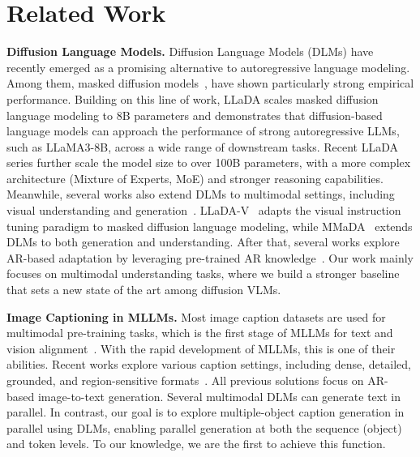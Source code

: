 \section{Related Work}
\label{sec:related_work}

\noindent
\textbf{Diffusion Language Models.} Diffusion Language Models (DLMs) have recently emerged as a promising alternative to autoregressive language modeling. 
%
Among them, masked diffusion models~\citep{you2025llada, ye2025dream, yangmmada}, have shown particularly strong empirical performance.
%
Building on this line of work, LLaDA scales masked diffusion language modeling to 8B parameters and demonstrates that diffusion-based language models can approach the performance of strong autoregressive LLMs, such as LLaMA3-8B, across a wide range of downstream tasks.
%
Recent LLaDA series further scale the model size to over 100B parameters, with a more complex architecture (Mixture of Experts, MoE) and stronger reasoning capabilities.
%
Meanwhile, several works also extend DLMs to multimodal settings, including visual understanding and generation~\citep{yangmmada, xin2025lumina}.
%
LLaDA-V~\citep{you2025llada} adapts the visual instruction tuning paradigm to masked diffusion language modeling, while MMaDA~\citep{yangmmada} extends DLMs to both generation and understanding.
%
After that, several works explore AR-based adaptation by leveraging pre-trained AR knowledge~\citep{cheng2025sdar, bie2025llada2}.
%
Our work mainly focuses on multimodal understanding tasks, where we build a stronger baseline that sets a new state of the art among diffusion VLMs.


\noindent
\textbf{Image Captioning in MLLMs.} Most image caption datasets are used for multimodal pre-training tasks, which is the first stage of MLLMs for text and vision alignment~\citep{li2025llava}.
%
With the rapid development of MLLMs, this is one of their abilities.
%
Recent works explore various caption settings, including dense, detailed, grounded, and region-sensitive formats~\citep{li2025denseworld, wang2025grasp}.
%
All previous solutions focus on AR-based image-to-text generation.
%
Several multimodal DLMs can generate text in parallel.
%
In contrast, our goal is to explore multiple-object caption generation in parallel using DLMs, enabling parallel generation at both the sequence (object) and token levels.
%
To our knowledge, we are the first to achieve this function.

